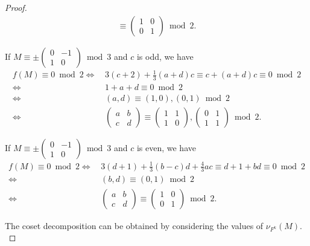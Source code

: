 \documentclass[12pt]{article}
\theoremstyle{definition}
\numberwithin{equation}{section}
\numberwithin{theorem}{section}
\begin{document}
\begin{proof}
\begin{align*}
\equiv 
\begin{pmatrix}
1 & 0 \\
0 & 1
\end{pmatrix}
\bmod{2}. 
\end{align*}
\par
If $M \equiv \pm
\begin{pmatrix}
0 & -1 \\
1 & 0
\end{pmatrix}
\bmod{3}
$ 
and $c$ is odd, 
we have 
\begin{align*}
f(M)\equiv 0 \bmod{2}
\Longleftrightarrow& \,
3(c+2)+\frac13 (a+d)c \equiv c+(a+d)c \equiv 0 \bmod{2} \\
\Longleftrightarrow& \,
1+a+d\equiv 0 \bmod{2} \\
\Longleftrightarrow& \,
(a,d)\equiv (1,0), (0,1) \bmod{2} \\
\Longleftrightarrow& \,
\begin{pmatrix}
a & b \\
c & d
\end{pmatrix}
\equiv 
\begin{pmatrix}
1 & 1 \\
1 & 0
\end{pmatrix},
\begin{pmatrix}
0 & 1 \\
1 & 1
\end{pmatrix}
\bmod{2}. 
\end{align*}
\par
If $M \equiv \pm
\begin{pmatrix}
0 & -1 \\
1 & 0
\end{pmatrix}
\bmod{3}
$ 
and $c$ is even, 
we have 
\begin{align*}
f(M)\equiv 0 \bmod{2}
\Longleftrightarrow& \,
3(d+1)+\frac13 (b-c)d+\frac43ac \equiv d+1+bd \equiv 0 \bmod{2} \\
\Longleftrightarrow& \,
(b,d)\equiv  (0,1) \bmod{2} \\
\Longleftrightarrow& \,
\begin{pmatrix}
a & b \\
c & d
\end{pmatrix}
\equiv 
\begin{pmatrix}
1 & 0 \\
0 & 1
\end{pmatrix}
\bmod{2}. 
\end{align*}
\par
The coset decomposition can be obtained by considering the values of $\nu_{F^{k}  }(M).$
\end{proof}
\end{document}
